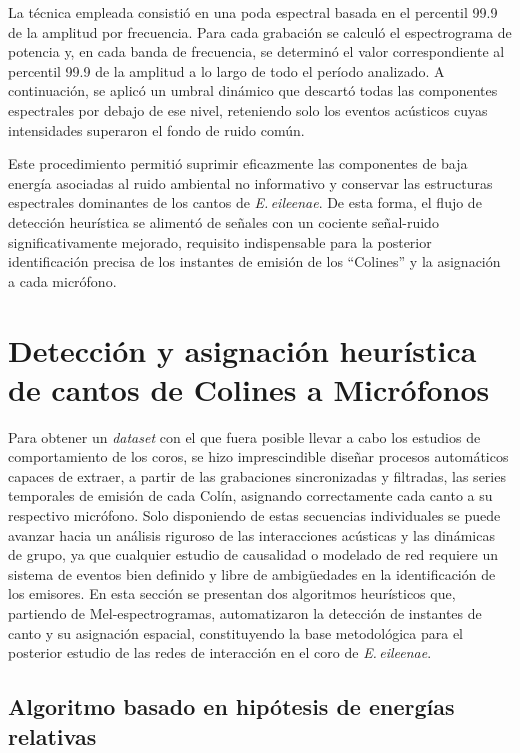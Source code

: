 La técnica empleada consistió en una poda espectral basada en 
el percentil 99.9 de la amplitud por frecuencia. 
Para cada grabación se calculó el 
espectrograma de potencia y, en cada banda de frecuencia, se 
determinó el valor correspondiente al percentil 99.9 de la 
amplitud a lo largo de todo el período analizado. 
A continuación, se aplicó un umbral 
dinámico que descartó todas las componentes espectrales por 
debajo de ese nivel, reteniendo solo los eventos acústicos 
cuyas intensidades superaron el fondo de ruido común.

Este procedimiento permitió suprimir eficazmente las 
componentes de baja energía asociadas al ruido ambiental no 
informativo y conservar las estructuras espectrales dominantes 
de los cantos de \emph{E.\,eileenae}. 
De esta forma, el flujo de detección heurística se alimentó de 
señales con un cociente señal-ruido significativamente mejorado, 
requisito indispensable para la posterior identificación 
precisa de los instantes de emisión de los “Colines” y la 
asignación a cada micrófono.  


\section{Detección y asignación heurística de cantos de Colines a Micrófonos}
\label{sec:deteccion_asignacion}


Para obtener un \emph{dataset} con el que fuera posible llevar a cabo 
los estudios de comportamiento de los coros, 
se hizo imprescindible diseñar procesos automáticos 
capaces de extraer, a partir de las grabaciones sincronizadas y 
filtradas, las series temporales de emisión de cada Colín,
asignando correctamente cada canto a su respectivo micrófono.
Solo disponiendo de estas secuencias individuales se puede 
avanzar hacia un análisis riguroso de las interacciones 
acústicas y las dinámicas de grupo, ya que cualquier estudio
de causalidad o modelado de red requiere un 
sistema de eventos bien definido y libre de ambigüedades en la 
identificación de los emisores. En esta sección se presentan 
dos algoritmos heurísticos que, partiendo de Mel-espectrogramas, 
automatizaron la detección de instantes de 
canto y su asignación espacial, constituyendo la base 
metodológica para el posterior estudio de las redes de 
interacción en el coro de \emph{E.\,eileenae}.



\subsection{Algoritmo basado en hipótesis de energías relativas}
\label{sec:alg_energia}

